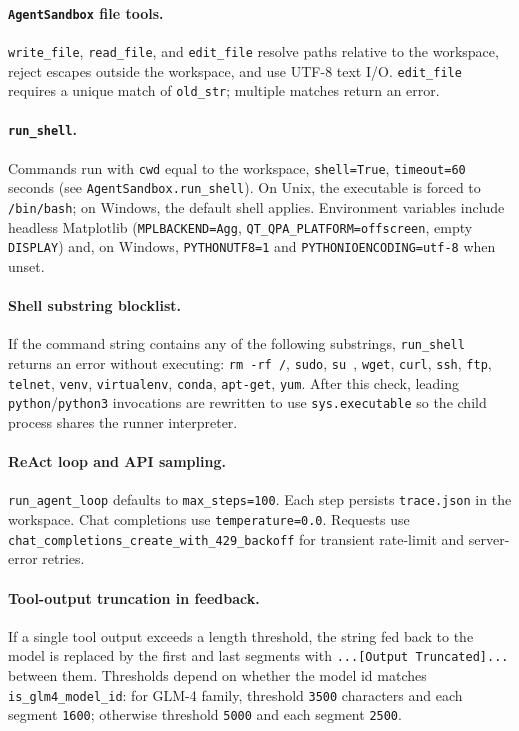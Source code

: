\begin{AgentDetails}
\paragraph{\texttt{AgentSandbox} file tools.}
\texttt{write\_file}, \texttt{read\_file}, and \texttt{edit\_file} resolve paths relative to the workspace, reject escapes outside the workspace, and use UTF-8 text I/O. \texttt{edit\_file} requires a unique match of \texttt{old\_str}; multiple matches return an error.

\paragraph{\texttt{run\_shell}.}
Commands run with \texttt{cwd} equal to the workspace, \texttt{shell=True}, \texttt{timeout=60} seconds (see \texttt{AgentSandbox.run\_shell}). On Unix, the executable is forced to \texttt{/bin/bash}; on Windows, the default shell applies. Environment variables include headless Matplotlib (\texttt{MPLBACKEND=Agg}, \texttt{QT\_QPA\_PLATFORM=offscreen}, empty \texttt{DISPLAY}) and, on Windows, \texttt{PYTHONUTF8=1} and \texttt{PYTHONIOENCODING=utf-8} when unset.

\paragraph{Shell substring blocklist.}
If the command string contains any of the following substrings, \texttt{run\_shell} returns an error without executing: \texttt{rm -rf /}, \texttt{sudo}, \texttt{su }, \texttt{wget}, \texttt{curl}, \texttt{ssh}, \texttt{ftp}, \texttt{telnet}, \texttt{venv}, \texttt{virtualenv}, \texttt{conda}, \texttt{apt-get}, \texttt{yum}. After this check, leading \texttt{python}/\texttt{python3} invocations are rewritten to use \texttt{sys.executable} so the child process shares the runner interpreter.

\paragraph{ReAct loop and API sampling.}
\texttt{run\_agent\_loop} defaults to \texttt{max\_steps=100}. Each step persists \texttt{trace.json} in the workspace. Chat completions use \texttt{temperature=0.0}. Requests use \texttt{chat\_completions\_create\_with\_429\_backoff} for transient rate-limit and server-error retries.

\paragraph{Tool-output truncation in feedback.}
If a single tool output exceeds a length threshold, the string fed back to the model is replaced by the first and last segments with \texttt{...[Output Truncated]...} between them. Thresholds depend on whether the model id matches \texttt{is\_glm4\_model\_id}: for GLM-4 family, threshold \texttt{3500} characters and each segment \texttt{1600}; otherwise threshold \texttt{5000} and each segment \texttt{2500}.


\end{AgentDetails}
